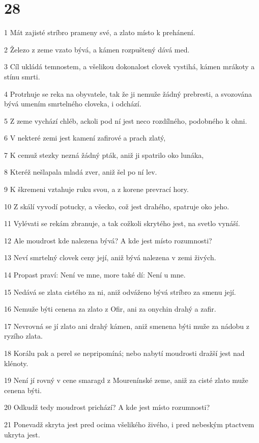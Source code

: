 \chapter{28}

\par 1 Mát zajisté stríbro prameny své, a zlato místo k prehánení.
\par 2 Železo z zeme vzato bývá, a kámen rozpuštený dává med.
\par 3 Cíl ukládá temnostem, a všelikou dokonalost clovek vystihá, kámen mrákoty a stínu smrti.
\par 4 Protrhuje se reka na obyvatele, tak že ji nemuže žádný prebresti, a svozována bývá umením smrtelného cloveka, i odchází.
\par 5 Z zeme vychází chléb, ackoli pod ní jest neco rozdílného, podobného k ohni.
\par 6 V nekteré zemi jest kamení zafirové a prach zlatý,
\par 7 K cemuž stezky nezná žádný pták, aniž ji spatrilo oko lunáka,
\par 8 Kteréž nešlapala mladá zver, aniž šel po ní lev.
\par 9 K škremeni vztahuje ruku svou, a z korene prevrací hory.
\par 10 Z skálí vyvodí potucky, a všecko, což jest drahého, spatruje oko jeho.
\par 11 Vylévati se rekám zbranuje, a tak cožkoli skrytého jest, na svetlo vynáší.
\par 12 Ale moudrost kde nalezena bývá? A kde jest místo rozumnosti?
\par 13 Neví smrtelný clovek ceny její, aniž bývá nalezena v zemi živých.
\par 14 Propast praví: Není ve mne, more také dí: Není u mne.
\par 15 Nedává se zlata cistého za ni, aniž odváženo bývá stríbro za smenu její.
\par 16 Nemuže býti cenena za zlato z Ofir, ani za onychin drahý a zafir.
\par 17 Nevrovná se jí zlato ani drahý kámen, aniž smenena býti muže za nádobu z ryzího zlata.
\par 18 Korálu pak a perel se nepripomíná; nebo nabytí moudrosti dražší jest nad klénoty.
\par 19 Není jí rovný v cene smaragd z Mourenínské zeme, aniž za cisté zlato muže cenena býti.
\par 20 Odkudž tedy moudrost prichází? A kde jest místo rozumnosti?
\par 21 Ponevadž skryta jest pred ocima všelikého živého, i pred nebeským ptactvem ukryta jest.
